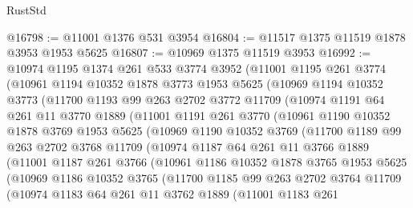 \begin{lexlean}{RustStd}
\begin{coremodule}
@16798 := @11001 @1376 @531 @3954
@16804 := @11517 @1375 @11519 @1878 @3953 @1953 @5625
@16807 := @10969 @1375 @11519 @3953
@16992 := @10974
    @1195
    @1374
    @261
    @533
    @3774
    @3952
    (@11001
      @1195
      @261
      @3774
      (@10961
        @1194
        @10352
        @1878
        @3773
        @1953
        @5625
        (@10969
          @1194
          @10352
          @3773
          (@11700
            @1193
            @99
            @263
            @2702
            @3772
            @11709
            (@10974
              @1191
              @64
              @261
              @11
              @3770
              @1889
              (@11001
                @1191
                @261
                @3770
                (@10961
                  @1190
                  @10352
                  @1878
                  @3769
                  @1953
                  @5625
                  (@10969
                    @1190
                    @10352
                    @3769
                    (@11700
                      @1189
                      @99
                      @263
                      @2702
                      @3768
                      @11709
                      (@10974
                        @1187
                        @64
                        @261
                        @11
                        @3766
                        @1889
                        (@11001
                          @1187
                          @261
                          @3766
                          (@10961
                            @1186
                            @10352
                            @1878
                            @3765
                            @1953
                            @5625
                            (@10969
                              @1186
                              @10352
                              @3765
                              (@11700
                                @1185
                                @99
                                @263
                                @2702
                                @3764
                                @11709
                                (@10974
                                  @1183
                                  @64
                                  @261
                                  @11
                                  @3762
                                  @1889
                                  (@11001
                                    @1183
                                    @261

\end{coremodule}
\end{lexlean}
